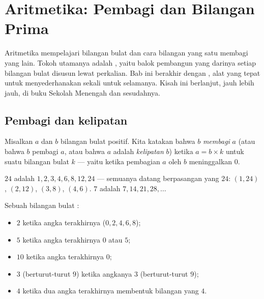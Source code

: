 \chapter{Aritmetika: Pembagi dan Bilangan Prima}\label{ch:g9:arith}

Aritmetika mempelajari bilangan bulat dan cara bilangan yang satu
membagi yang lain. Tokoh utamanya adalah , yaitu balok
pembangun yang darinya setiap bilangan bulat disusun lewat perkalian.
Bab ini berakhir dengan , alat yang tepat
untuk menyederhanakan  sekali untuk selamanya. Kisah ini
berlanjut, jauh lebih jauh, di buku Sekolah Menengah dan sesudahnya.

\section{Pembagi dan kelipatan}

\begin{definition}\label{def:g9:arith:divisor}
Misalkan $a$ dan $b$ bilangan bulat positif. Kita katakan bahwa $b$
\emph{membagi} $a$ (atau bahwa $b$ pembagi $a$, atau
bahwa $a$ adalah \emph{kelipatan} $b$) ketika
$a = b \times k$ untuk suatu bilangan bulat $k$ --- yaitu ketika
pembagian $a$ oleh $b$ meninggalkan  $0$.
\end{definition}

\begin{example}
 $24$ adalah $1, 2, 3, 4, 6, 8, 12, 24$ --- semuanya datang
berpasangan yang  $24$: $(1,24)$, $(2,12)$, $(3,8)$,
$(4,6)$.  $7$ adalah $7, 14, 21, 28, \dots$
\end{example}

\begin{proposition}\label{prop:g9:arith:rules}
Sebuah bilangan bulat :
\begin{itemize}
  \item $2$ ketika angka terakhirnya  ($0, 2, 4, 6, 8$);
  \item $5$ ketika angka terakhirnya $0$ atau $5$;
  \item $10$ ketika angka terakhirnya $0$;
  \item $3$ (berturut-turut $9$) ketika  angkanya 
        $3$ (berturut-turut $9$);
  \item $4$ ketika dua angka terakhirnya membentuk bilangan yang  $4$.
\end{itemize}
\end{proposition}
\admitted

